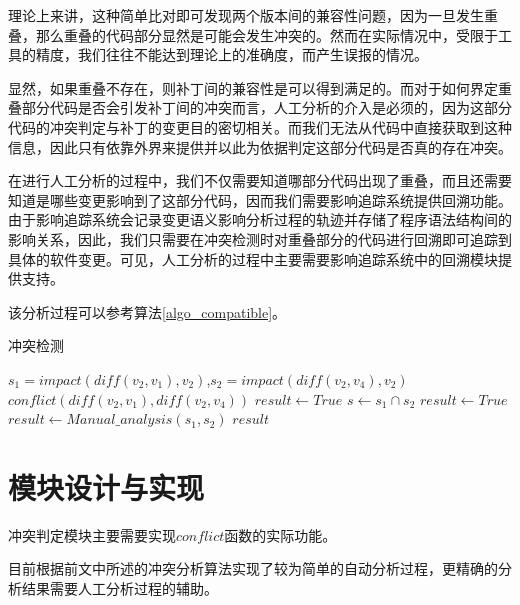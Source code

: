 理论上来讲，这种简单比对即可发现两个版本间的兼容性问题，因为一旦发生重叠，那么重叠的代码部分显然是可能会发生冲突的。然而在实际情况中，受限于工具的精度，我们往往不能达到理论上的准确度，而产生误报的情况。

显然，如果重叠不存在，则补丁间的兼容性是可以得到满足的。而对于如何界定重叠部分代码是否会引发补丁间的冲突而言，人工分析的介入是必须的，因为这部分代码的冲突判定与补丁的变更目的密切相关。而我们无法从代码中直接获取到这种信息，因此只有依靠外界来提供并以此为依据判定这部分代码是否真的存在冲突。

在进行人工分析的过程中，我们不仅需要知道哪部分代码出现了重叠，而且还需要知道是哪些变更影响到了这部分代码，因而我们需要影响追踪系统提供回溯功能。由于影响追踪系统会记录变更语义影响分析过程的轨迹并存储了程序语法结构间的影响关系，因此，我们只需要在冲突检测时对重叠部分的代码进行回溯即可追踪到具体的软件变更。可见，人工分析的过程中主要需要影响追踪系统中的回溯模块提供支持。


该分析过程可以参考算法\ref {algo_compatible}。

\begin{algorithm}[H]
	\caption{冲突检测}
	\label{algo_compatible}
	\begin{algorithmic}[1]
		\Require $s_1=impact(diff(v_2,v_1),v_2)$,$s_2=impact(diff(v_2,v_4),v_2)$
		\Ensure $conflict(diff(v_2,v_1),diff(v_2,v_4))$
		\State $result \gets True$
		\Else
		\State $s \gets s_1 \cap s_2$
		\State $result \gets True$
		\Else				
		\State $result \gets Manual\_analysis(s_1, s_2)$
		\EndIf 
		\EndIf
		\Return $result$
	\end{algorithmic}
\end{algorithm}


\section{模块设计与实现}
\label {chap_mod}

冲突判定模块主要需要实现$conflict$函数的实际功能。

目前根据前文中所述的冲突分析算法实现了较为简单的自动分析过程，更精确的分析结果需要人工分析过程的辅助。

%
%


